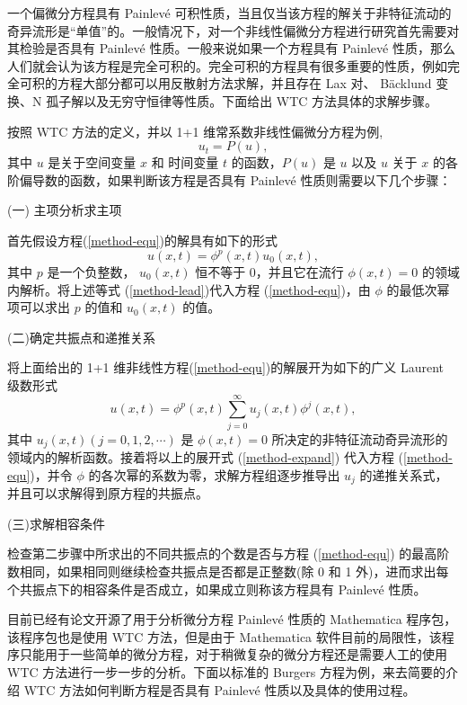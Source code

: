 一个偏微分方程具有 Painlev\'{e} 可积性质，当且仅当该方程的解关于非特征流动的奇异流形是“单值”的。一般情况下，对一个非线性偏微分方程进行研究首先需要对其检验是否具有  Painlev\'{e} 性质。一般来说如果一个方程具有 Painlev\'{e} 性质，那么人们就会认为该方程是完全可积的。完全可积的方程具有很多重要的性质，例如完全可积的方程大部分都可以用反散射方法求解，并且存在 Lax 对、 B\"{a}cklund 变换、N 孤子解以及无穷守恒律等性质。下面给出 WTC 方法具体的求解步骤。

按照 WTC 方法的定义，并以  1+1 维常系数非线性偏微分方程为例,
\begin{equation}
u_t=P(u),\label{method-equ}
\end{equation}
其中 $u$ 是关于空间变量 $x$ 和 时间变量 $t$ 的函数，$P(u)$ 是 $u$ 以及 $u$ 关于 $x$ 的各阶偏导数的函数，如果判断该方程是否具有  Painlev\'{e} 性质则需要以下几个步骤：

(一) 主项分析求主项

首先假设方程(\ref{method-equ})的解具有如下的形式
\begin{equation}
u(x,t)=\phi^p(x,t) u_0(x,t),\label{method-lead}
\end{equation}
其中 $p$ 是一个负整数， $u_0(x,t)$ 恒不等于 0，并且它在流行 $\phi(x,t)=0$ 的领域内解析。将上述等式 (\ref{method-lead})代入方程 (\ref{method-equ})，由 $\phi$ 的最低次幂项可以求出 $p$ 的值和 $u_0(x,t)$ 的值。

(二)确定共振点和递推关系

将上面给出的 1+1 维非线性方程(\ref{method-equ})的解展开为如下的广义 Laurent 级数形式
\begin{equation}
u(x,t)=\phi^p(x,t)\sum_{j=0}^\infty u_j(x,t) \phi^j(x,t),\label{method-expand}
\end{equation}
其中 $u_j(x,t)(j=0,1,2,\cdots)$ 是 $\phi(x,t)=0$ 所决定的非特征流动奇异流形的领域内的解析函数。接着将以上的展开式 (\ref{method-expand}) 代入方程 (\ref{method-equ})，并令 $\phi$ 的各次幂的系数为零，求解方程组逐步推导出 $u_j$ 的递推关系式，并且可以求解得到原方程的共振点。

(三)求解相容条件

检查第二步骤中所求出的不同共振点的个数是否与方程 (\ref{method-equ}) 的最高阶数相同，如果相同则继续检查共振点是否都是正整数(除 0 和  1 外)，进而求出每个共振点下的相容条件是否成立，如果成立则称该方程具有 Painlev\'{e} 性质。

目前已经有论文开源了用于分析微分方程 Painlev\'{e} 性质的 Mathematica 程序包，该程序包也是使用 WTC 方法，但是由于 Mathematica 软件目前的局限性，该程序只能用于一些简单的微分方程，对于稍微复杂的微分方程还是需要人工的使用 WTC 方法进行一步一步的分析。下面以标准的 Burgers 方程为例，来去简要的介绍 WTC 方法如何判断方程是否具有 Painlev\'{e} 性质以及具体的使用过程。

